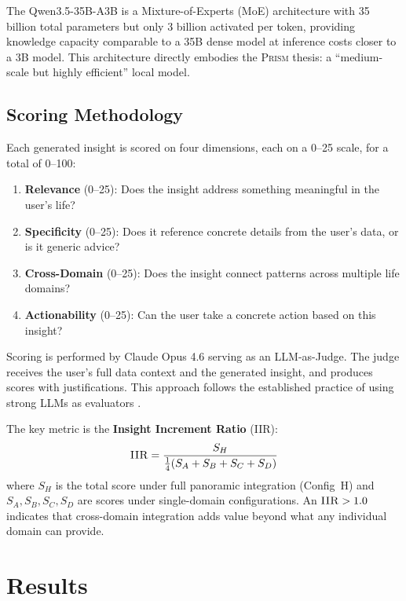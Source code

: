 \documentclass[11pt,a4paper]{article}
\newcommand{\echostream}{\textsc{Prism}}
\newcommand{\iir}{\textsc{IIR}}
\begin{document}
The Qwen3.5-35B-A3B is a Mixture-of-Experts (MoE) architecture with 35
billion total parameters but only 3 billion activated per token, providing
knowledge capacity comparable to a 35B dense model at inference costs closer
to a 3B model. This architecture directly embodies the \echostream{} thesis:
a ``medium-scale but highly efficient'' local model.

\subsection{Scoring Methodology}
\label{sec:setup:scoring}

Each generated insight is scored on four dimensions, each on a 0--25 scale,
for a total of 0--100:

\begin{enumerate}[leftmargin=*,itemsep=2pt]
  \item \textbf{Relevance} (0--25): Does the insight address something
    meaningful in the user's life?
  \item \textbf{Specificity} (0--25): Does it reference concrete details
    from the user's data, or is it generic advice?
  \item \textbf{Cross-Domain} (0--25): Does the insight connect patterns
    across multiple life domains?
  \item \textbf{Actionability} (0--25): Can the user take a concrete
    action based on this insight?
\end{enumerate}

Scoring is performed by Claude Opus 4.6 \citep{anthropic2025claude} serving as an
LLM-as-Judge. The judge receives the user's full data context and the
generated insight, and produces scores with justifications. This approach
follows the established practice of using strong LLMs as evaluators
\citep{zheng2023judging}.

The key metric is the \textbf{Insight Increment Ratio} (\iir{}):
\begin{equation}
\iir{} = \frac{S_H}{\frac{1}{4}(S_A + S_B + S_C + S_D)}
\label{eq:iir}
\end{equation}
where $S_H$ is the total score under full panoramic integration (Config~H)
and $S_A, S_B, S_C, S_D$ are scores under single-domain configurations.
An $\iir{} > 1.0$ indicates that cross-domain integration adds value beyond
what any individual domain can provide.


\section{Results}
\label{sec:results}
\end{document}
